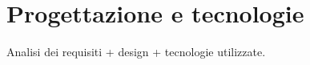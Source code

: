 \chapter{Progettazione e tecnologie}\label{chap:Progetto}
Analisi dei requisiti + design + tecnologie utilizzate.




